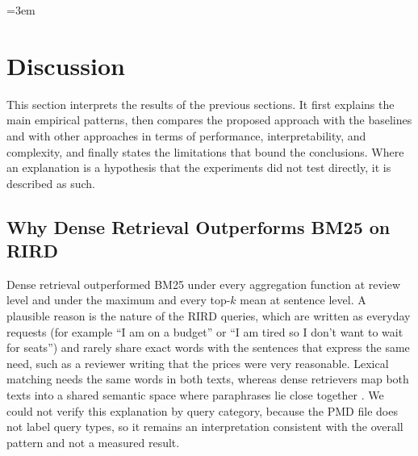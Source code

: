 \providecommand{\mpnet}{\texttt{paraphrase-\allowbreak multilingual-\allowbreak mpnet-\allowbreak base-\allowbreak v2}}
\providecommand{\cemodel}{\texttt{ms-marco-\allowbreak MiniLM-\allowbreak L-6-\allowbreak v2}}
\emergencystretch=3em
\providecommand{\pending}[1]{\textbf{[PENDING: #1]}}

\section{Discussion}
\label{sec:discussion}

This section interprets the results of the previous sections. It first explains the main empirical patterns, then compares the proposed approach with the baselines and with other approaches in terms of performance, interpretability, and complexity, and finally states the limitations that bound the conclusions. Where an explanation is a hypothesis that the experiments did not test directly, it is described as such.

\subsection{Why Dense Retrieval Outperforms BM25 on RIRD}
\label{sec:discdense}

Dense retrieval outperformed BM25 under every aggregation function at review level and under the maximum and every top-$k$ mean at sentence level. A plausible reason is the nature of the RIRD queries, which are written as everyday requests (for example ``I am on a budget'' or ``I am tired so I don't want to wait for seats'') and rarely share exact words with the sentences that express the same need, such as a reviewer writing that the prices were very reasonable. Lexical matching needs the same words in both texts, whereas dense retrievers map both texts into a shared semantic space where paraphrases lie close together \citep{karpukhin2020, reimers2019}. We could not verify this explanation by query category, because the PMD file does not label query types, so it remains an interpretation consistent with the overall pattern and not a measured result.

